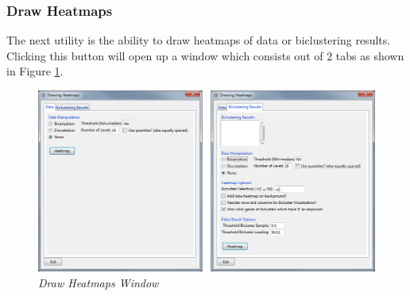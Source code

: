 \documentclass[a4paper]{article}\usepackage[]{graphicx}\usepackage[]{color}
\begin{document}
\subsubsection{Draw Heatmaps}
The next utility is the ability to draw heatmaps of data or biclustering
results. Clicking this button will open up a window which consists out of 2 tabs
as shown in Figure \ref{drawheatmapswindow}. 
\begin{figure}[H]
\centering
\includegraphics[scale=0.4]{figures/drawheatmapswindow.png}
\caption{{\it Draw Heatmaps Window }\label{drawheatmapswindow}}
\end{figure}
\end{document}
